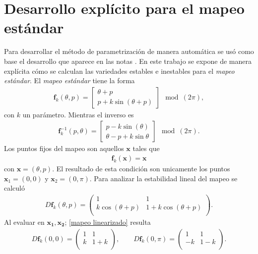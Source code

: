 \section{Desarrollo explícito para el mapeo estándar}
Para desarrollar el método de parametrización de manera automática se usó como base el desarrollo que aparece en las notas \cite{Mireles}. En este trabajo se expone de manera explícita cómo se calculan las variedades estables e inestables para el \textit{mapeo estándar}. El \textit{mapeo estándar} tiene la forma \citep{devaney}
\begin{eqnarray}
\mathbf{f}_{k}(\theta,p) = \left[\begin{array}{c}
\theta + p \\
p + k\sin(\theta +p)
\end{array}\right] \mod(2\pi),  \label{mapeo estandar}
\end{eqnarray}
con $k$ un parámetro. Mientras el inverso es
\begin{eqnarray}
\mathbf{f}_{k}^{-1}(p,\theta) = \left[\begin{array}{c}
p  -k\sin(\theta) \\
\theta-p+k\sin{\theta}
\end{array}\right] \mod(2\pi). \label{mapeo estandar inverso}
\end{eqnarray}
Los puntos fijos del mapeo son aquellos $\mathbf{x}$ tales que 
\begin{eqnarray}
\mathbf{f}_{k}(\mathbf{x})=\mathbf{x} \label{ec puntos fijos}
\end{eqnarray}
con $\mathbf{x}=(\theta,p)$. El resultado de esta condición son unicamente los puntos $\mathbf{x}_{1}=(0,0)$ y $\mathbf{x}_{2}=(0,\pi)$. Para analizar la estabilidad lineal del mapeo se calculó
\begin{eqnarray}
D\mathbf{f}_{k}(\theta,p)=\begin{pmatrix}
1 & 1 \\
k\cos(\theta+p)& 1+k\cos(\theta+p)\\ 
\end{pmatrix}.\label{mapeo linearizado}
\end{eqnarray}
Al evaluar en $\mathbf{x_{1}},\mathbf{x_{2}}$; \eqref{mapeo linearizado} resulta 
\begin{eqnarray}
D\mathbf{f}_{k}(0,0)=
\begin{pmatrix}
1 & 1\\
k & 1+k\\
\end{pmatrix}, \qquad D\mathbf{f}_{k}(0,\pi)= \begin{pmatrix}
1 & 1\\
-k & 1-k\\
\end{pmatrix}.
\end{eqnarray}
